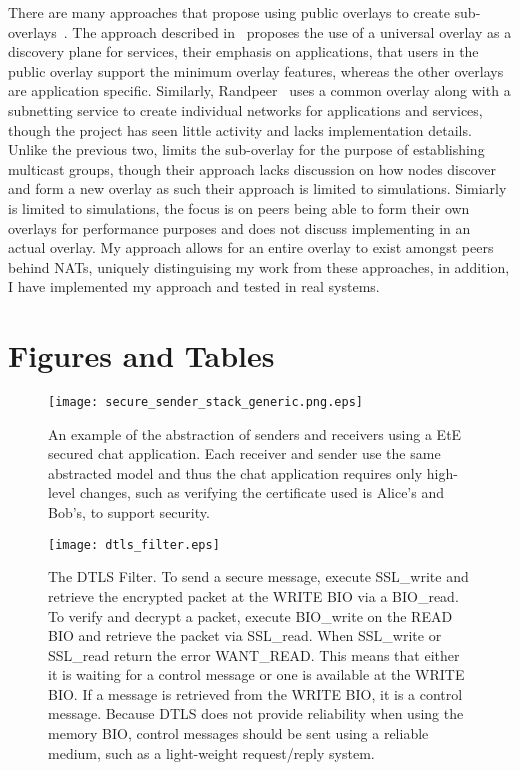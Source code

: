 There are many approaches that propose using public overlays to create
sub-overlays~\cite{one_ring, randpeer, can_multicast, community_overlays}.
The approach described in~\cite{one_ring} proposes the use of a universal
overlay as a discovery plane for services, their emphasis on applications,
that users in the public overlay support the minimum overlay features,
whereas the other overlays are application specific.  Similarly,
Randpeer~\cite{randpeer} uses a common overlay along with a subnetting service
to create individual networks for applications and services, though the project
has seen little activity and lacks implementation details.  Unlike the previous
two, \cite{can_multicast} limits the sub-overlay for the purpose of establishing
multicast groups, though their approach lacks discussion on how nodes discover
and form a new overlay as such their approach is limited to simulations.
Simiarly \cite{community_overlays} is limited to simulations, the focus is
on peers being able to form their own overlays for performance purposes and
does not discuss implementing in an actual overlay.  My approach allows for an
entire overlay to exist amongst peers behind NATs, uniquely distinguising my
work from these approaches, in addition, I have implemented my approach and
tested in real systems.

\section{Figures and Tables}

\begin{figure}[ht]
\centering
\texttt{[image: secure\_sender\_stack\_generic.png.eps]}
\caption[Secure sender stack]{An example of the abstraction of senders and
receivers using a EtE secured chat application.  Each receiver and sender use
the same abstracted model and thus the chat application requires only high-level
changes, such as verifying the certificate used is Alice's and Bob's, to support
security.}
\label{fig:senders_receivers}
\end{figure}

\begin{figure}[ht]
\centering
\texttt{[image: dtls\_filter.eps]}
\caption[The DTLS filter.]{The DTLS Filter.  To send a secure message, execute
SSL\_write and retrieve the encrypted packet at the WRITE BIO via a BIO\_read.
To verify and decrypt a packet, execute BIO\_write on the READ BIO and retrieve
the packet via SSL\_read.  When SSL\_write or SSL\_read return the error
WANT\_READ.  This means that either it is waiting for a control message or one
is available at the WRITE BIO.  If a message is retrieved from the WRITE BIO,
it is a control message.  Because DTLS does not provide reliability when using
the memory BIO, control messages should be sent using a reliable medium, such
as a light-weight request/reply system.}
\label{fig:dtls_filter}
\end{figure}


